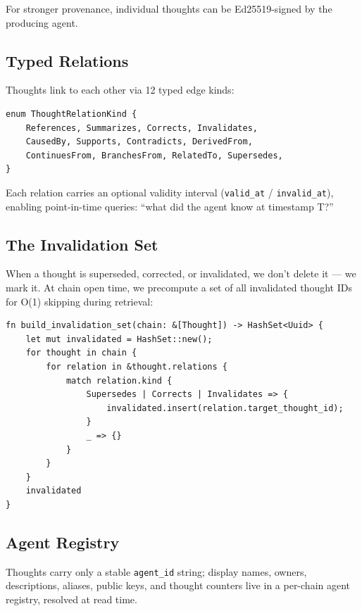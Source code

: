 \documentclass[11pt,a4paper]{article}
\begin{document}
For stronger provenance, individual thoughts can be Ed25519-signed by the producing agent.

\subsection{Typed Relations}

Thoughts link to each other via 12 typed edge kinds:

\begin{lstlisting}
enum ThoughtRelationKind {
    References, Summarizes, Corrects, Invalidates,
    CausedBy, Supports, Contradicts, DerivedFrom,
    ContinuesFrom, BranchesFrom, RelatedTo, Supersedes,
}
\end{lstlisting}

Each relation carries an optional validity interval (\texttt{valid\_at} /
\texttt{invalid\_at}), enabling point-in-time queries: ``what did the agent know at
timestamp T?''

\subsection{The Invalidation Set}

When a thought is superseded, corrected, or invalidated, we don't delete it — we mark it.
At chain open time, we precompute a set of all invalidated thought IDs for O(1) skipping
during retrieval:

\begin{lstlisting}
fn build_invalidation_set(chain: &[Thought]) -> HashSet<Uuid> {
    let mut invalidated = HashSet::new();
    for thought in chain {
        for relation in &thought.relations {
            match relation.kind {
                Supersedes | Corrects | Invalidates => {
                    invalidated.insert(relation.target_thought_id);
                }
                _ => {}
            }
        }
    }
    invalidated
}
\end{lstlisting}

\subsection{Agent Registry}

Thoughts carry only a stable \texttt{agent\_id} string; display names, owners, descriptions,
aliases, public keys, and thought counters live in a per-chain agent registry, resolved at
read time.

\end{document}
